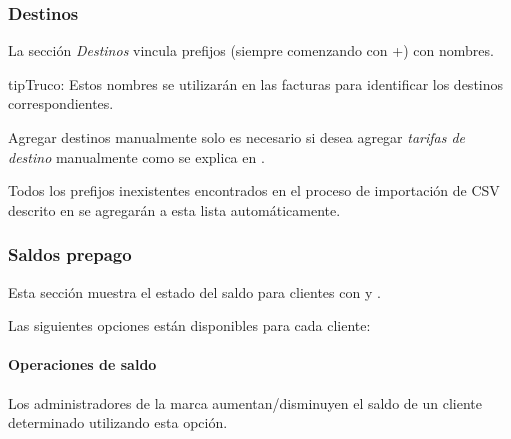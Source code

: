 \documentclass[letterpaper,10pt,spanish]{sphinxmanual}
\begin{document}
\subsubsection{Destinos}
\label{administration_portal/brand/billing/destinations::doc}\label{administration_portal/brand/billing/destinations:destinations}
La sección \emph{Destinos} vincula prefijos (siempre comenzando con +) con nombres.

\begin{notice}{tip}{Truco:}
Estos nombres se utilizarán en las facturas para identificar los destinos correspondientes.
\end{notice}

Agregar destinos manualmente solo es necesario si desea agregar \emph{tarifas de destino} manualmente como se explica en {\hyperref[administration_portal/brand/billing/destination_rates:add\string-rates\string-manually]{}}.

Todos los prefijos inexistentes encontrados en el proceso de importación de CSV descrito en {\hyperref[administration_portal/brand/billing/destination_rates:importing\string-a\string-csv\string-file]{}} se agregarán a esta lista automáticamente.


\subsubsection{Saldos prepago}
\label{administration_portal/brand/billing/prepaid_balances::doc}\label{administration_portal/brand/billing/prepaid_balances:prepaid-balances}
Esta sección muestra el estado del saldo para clientes con {\hyperref[administration_portal/brand/billing/index:prepaid\string-billing]{}} y {\hyperref[administration_portal/brand/billing/index:pseudo\string-prepaid\string-billing]{}}.

Las siguientes opciones están disponibles para cada cliente:


\paragraph{Operaciones de saldo}
\label{administration_portal/brand/billing/prepaid_balances:balance-operations}
Los administradores de la marca aumentan/disminuyen el saldo de un cliente determinado utilizando esta opción.
\end{document}
